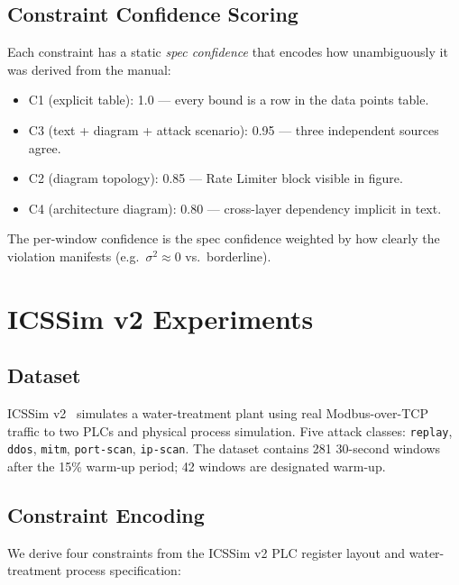 \documentclass[sigconf,anonymous,review]{acmart}
\begin{document}
\subsection{Constraint Confidence Scoring}
Each constraint has a static \emph{spec confidence} that encodes how
unambiguously it was derived from the manual:
\begin{itemize}
  \item C1 (explicit table): 1.0 — every bound is a row in the data points table.
  \item C3 (text + diagram + attack scenario): 0.95 — three independent sources agree.
  \item C2 (diagram topology): 0.85 — Rate Limiter block visible in figure.
  \item C4 (architecture diagram): 0.80 — cross-layer dependency implicit in text.
\end{itemize}
The per-window confidence is the spec confidence weighted by how
clearly the violation manifests (e.g.\ $\sigma^2 \approx 0$ vs.\ borderline).

\section{ICSSim v2 Experiments}
\label{sec:icssim}

\subsection{Dataset}
ICSSim v2~\cite{ICSSim2022} simulates a water-treatment plant using real
Modbus-over-TCP traffic to two PLCs and physical process simulation.  Five
attack classes: \texttt{replay}, \texttt{ddos}, \texttt{mitm},
\texttt{port-scan}, \texttt{ip-scan}.  The dataset contains 281 30-second
windows after the 15\% warm-up period; 42 windows are designated warm-up.

\subsection{Constraint Encoding}
We derive four constraints from the ICSSim v2 PLC register layout and
water-treatment process specification:
\end{document}
